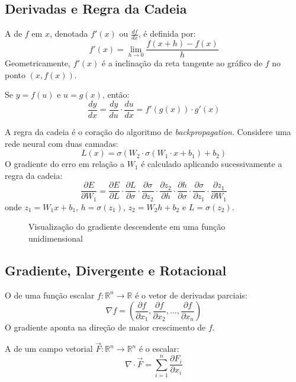 \subsection{Derivadas e Regra da Cadeia}
\begin{definicao}[Derivada]
A  de $f$ em $x$, denotada $f'(x)$ ou
$\frac{df}{dx}$, é definida por:
\[f'(x) = \lim_{h \to 0} \frac{f(x + h) - f(x)}{h}
\]
Geometricamente, $f'(x)$ é a inclinação da reta tangente ao gráfico de
$f$ no ponto $(x, f(x))$.
\end{definicao}
\begin{teorema}
Se $y = f(u)$ e $u = g(x)$, então:
\[\frac{dy}{dx} = \frac{dy}{du} \cdot \frac{du}{dx} = f'(g(x)) \cdot g'(x)
\]
\end{teorema}
\begin{exemplo}
A regra da cadeia é o coração do algoritmo de \textit{backpropagation}.
Considere uma rede neural com duas camadas:
\[L(x) = \sigma(W_2 \cdot \sigma(W_1 \cdot x + b_1) + b_2)
\]
O gradiente do erro em relação a $W_1$ é calculado aplicando
sucessivamente a regra da cadeia:
\[\frac{\partial E}{\partial W_1} = \frac{\partial E}{\partial L} \cdot
\frac{\partial L}{\partial \sigma} \cdot
\frac{\partial \sigma}{\partial z_2} \cdot
\frac{\partial z_2}{\partial h} \cdot
\frac{\partial h}{\partial \sigma} \cdot
\frac{\partial \sigma}{\partial z_1} \cdot
\frac{\partial z_1}{\partial W_1}
\]
onde $z_1 = W_1 x + b_1$, $h = \sigma(z_1)$, $z_2 = W_2 h + b_2$ e
$L = \sigma(z_2)$.
\end{exemplo}
\begin{figure}[htb]
\centering
\caption{Visualização do gradiente descendente em uma função
unidimensional}
\label{fig:gradiente-descendente}
\end{figure}
\subsection{Gradiente, Divergente e Rotacional}
\begin{definicao}[Gradiente]
O  de uma função escalar $f: \mathbb{R}^n \to
\mathbb{R}$ é o vetor de derivadas parciais:
\[\nabla f = \left(\frac{\partial f}{\partial x_1},
\frac{\partial f}{\partial x_2}, \ldots,
\frac{\partial f}{\partial x_n} \right)
\]
O gradiente aponta na direção de maior crescimento de $f$.
\end{definicao}
\begin{definicao}[Divergente]
A  de um campo vetorial $\vec{F}: \mathbb{R}^n \to
\mathbb{R}^n$ é o escalar:
\[\nabla \cdot \vec{F} = \sum_{i=1}^{n} \frac{\partial F_i}{\partial x_i}
\]
\end{definicao}
